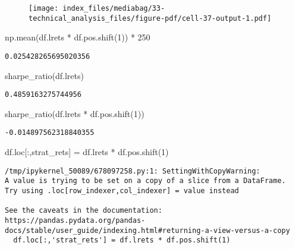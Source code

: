 \documentclass[
  letterpaper,
  DIV=11,
  numbers=noendperiod]{scrreprt}
\newenvironment{Shaded}{\begin{snugshade}}{\end{snugshade}}
\newcommand{\DecValTok}[1]{\textcolor[rgb]{0.68,0.00,0.00}{#1}}
\newcommand{\NormalTok}[1]{\textcolor[rgb]{0.00,0.23,0.31}{#1}}
\newcommand{\OperatorTok}[1]{\textcolor[rgb]{0.37,0.37,0.37}{#1}}
\newcommand{\StringTok}[1]{\textcolor[rgb]{0.13,0.47,0.30}{#1}}
\begin{document}
\begin{figure}[H]

{\centering \texttt{[image: index\_files/mediabag/33-technical\_analysis\_files/figure-pdf/cell-37-output-1.pdf]}

}

\end{figure}

\begin{Shaded}
\begin{Highlighting}[]
\NormalTok{np.mean(df.lrets }\OperatorTok{*}\NormalTok{ df.pos.shift(}\DecValTok{1}\NormalTok{)) }\OperatorTok{*} \DecValTok{250}
\end{Highlighting}
\end{Shaded}

\begin{verbatim}
0.025428265695020356
\end{verbatim}

\begin{Shaded}
\begin{Highlighting}[]
\NormalTok{sharpe\_ratio(df.lrets)}
\end{Highlighting}
\end{Shaded}

\begin{verbatim}
0.4859163275744956
\end{verbatim}

\begin{Shaded}
\begin{Highlighting}[]
\NormalTok{sharpe\_ratio(df.lrets }\OperatorTok{*}\NormalTok{ df.pos.shift(}\DecValTok{1}\NormalTok{))}
\end{Highlighting}
\end{Shaded}

\begin{verbatim}
-0.014897562318840355
\end{verbatim}

\begin{Shaded}
\begin{Highlighting}[]
\NormalTok{df.loc[:,}\StringTok{\textquotesingle{}strat\_rets\textquotesingle{}}\NormalTok{] }\OperatorTok{=}\NormalTok{ df.lrets }\OperatorTok{*}\NormalTok{ df.pos.shift(}\DecValTok{1}\NormalTok{)}
\end{Highlighting}
\end{Shaded}

\begin{verbatim}
/tmp/ipykernel_50089/678097258.py:1: SettingWithCopyWarning: 
A value is trying to be set on a copy of a slice from a DataFrame.
Try using .loc[row_indexer,col_indexer] = value instead

See the caveats in the documentation: https://pandas.pydata.org/pandas-docs/stable/user_guide/indexing.html#returning-a-view-versus-a-copy
  df.loc[:,'strat_rets'] = df.lrets * df.pos.shift(1)
\end{verbatim}
\end{document}
